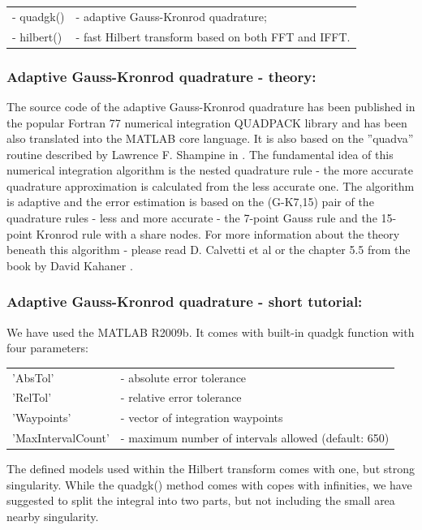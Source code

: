 \documentclass[12pt,twoside,a4paper]{article}
\numberwithin{equation}{subsection}
\numberwithin{figure}{subsection}
\begin{document}
\begin{tabular}{l l}
  - quadgk() &- adaptive Gauss-Kronrod quadrature; \\
  - hilbert() &- fast Hilbert transform based on both FFT and IFFT. \\
\end{tabular}


\subsubsection*{Adaptive Gauss-Kronrod quadrature - theory:}

The source code of the adaptive Gauss-Kronrod quadrature has been published in the popular Fortran 77 numerical integration
QUADPACK library and has been also translated into the MATLAB core language. It is also based on the ''quadva'' routine described by
Lawrence F. Shampine in \cite{shampine_vectorized}. The fundamental idea of this numerical integration algorithm is the nested
quadrature rule - the more accurate quadrature approximation is calculated from the less accurate one. The algorithm is adaptive
and the error estimation is based on the (G-K7,15) pair of the quadrature rules - less and more accurate - the 7-point Gauss rule
and the 15-point Kronrod rule with a share nodes. For more information about the theory beneath this algorithm - please read D.
Calvetti et al \cite{calvetti_computation} or the chapter 5.5 from the book by David Kahaner \cite{kahaner_numerical}.

\subsubsection*{Adaptive Gauss-Kronrod quadrature - short tutorial:}

We have used the MATLAB \textregistered R2009b. It comes with built-in quadgk function with four parameters:


\begin{tabular}{l l}
  'AbsTol'           & - absolute error tolerance \\
  'RelTol'           & - relative error tolerance \\
  'Waypoints'        & - vector of integration waypoints \\
  'MaxIntervalCount' & - maximum number of intervals allowed (default: 650) \\
\end{tabular}

The defined models used within the Hilbert transform comes with one, but strong singularity. While the quadgk() method comes with
copes with infinities, we have suggested to split the integral into two parts, but not including the small area nearby singularity.
\end{document}
